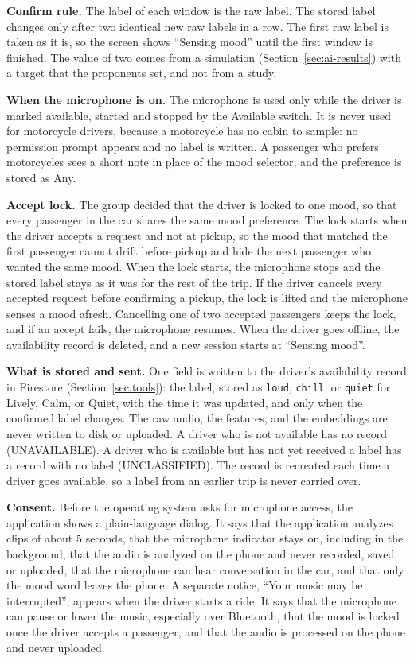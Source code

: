 \textbf{Confirm rule.} The label of each window is the raw label. The stored label changes only after two identical new raw labels in a row. The first raw label is taken as it is, so the screen shows ``Sensing mood'' until the first window is finished. The value of two comes from a simulation (Section~\ref{sec:ai-results}) with a target that the proponents set, and not from a study.

\textbf{When the microphone is on.} The microphone is used only while the driver is marked available, started and stopped by the Available switch. It is never used for motorcycle drivers, because a motorcycle has no cabin to sample: no permission prompt appears and no label is written. A passenger who prefers motorcycles sees a short note in place of the mood selector, and the preference is stored as Any.

\textbf{Accept lock.} The group decided that the driver is locked to one mood, so that every passenger in the car shares the same mood preference. The lock starts when the driver accepts a request and not at pickup, so the mood that matched the first passenger cannot drift before pickup and hide the next passenger who wanted the same mood. When the lock starts, the microphone stops and the stored label stays as it was for the rest of the trip. If the driver cancels every accepted request before confirming a pickup, the lock is lifted and the microphone senses a mood afresh. Cancelling one of two accepted passengers keeps the lock, and if an accept fails, the microphone resumes. When the driver goes offline, the availability record is deleted, and a new session starts at ``Sensing mood''.

\textbf{What is stored and sent.} One field is written to the driver's availability record in Firestore (Section~\ref{sec:tools}): the label, stored as \texttt{loud}, \texttt{chill}, or \texttt{quiet} for Lively, Calm, or Quiet, with the time it was updated, and only when the confirmed label changes. The raw audio, the features, and the embeddings are never written to disk or uploaded. A driver who is not available has no record (UNAVAILABLE). A driver who is available but has not yet received a label has a record with no label (UNCLASSIFIED). The record is recreated each time a driver goes available, so a label from an earlier trip is never carried over.

\textbf{Consent.} Before the operating system asks for microphone access, the application shows a plain-language dialog. It says that the application analyzes clips of about 5 seconds, that the microphone indicator stays on, including in the background, that the audio is analyzed on the phone and never recorded, saved, or uploaded, that the microphone can hear conversation in the car, and that only the mood word leaves the phone. A separate notice, ``Your music may be interrupted'', appears when the driver starts a ride. It says that the microphone can pause or lower the music, especially over Bluetooth, that the mood is locked once the driver accepts a passenger, and that the audio is processed on the phone and never uploaded.

